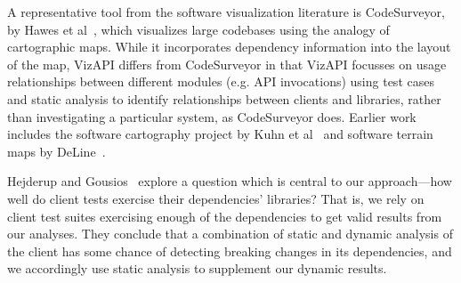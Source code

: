 \label{sec:related-work}
A representative tool from the software visualization literature is
CodeSurveyor, by Hawes et al~\cite{hawes15:_codes}, which visualizes large
codebases using the analogy of cartographic maps. While it
incorporates dependency information into the layout of the map, VizAPI
differs from CodeSurveyor in that VizAPI focusses on usage relationships
between different modules (e.g. API invocations) using test
cases and static analysis to identify relationships between clients and libraries, rather
than investigating a particular system, as CodeSurveyor does.  Earlier
work includes the software cartography project by Kuhn et
al~\cite{kuhn10:_softw} and software terrain maps by DeLine~\cite{deline05:_stayin}.




Hejderup and Gousios~\cite{DBLP:journals/jss/HejderupG22} explore a
question which is central to our approach---how well do client tests
exercise their dependencies' libraries? That is, we rely on
client test suites exercising enough of the dependencies to get valid
results from our analyses. They conclude that a combination of
static and dynamic analysis of the client has some chance of detecting
breaking changes in its dependencies, and we accordingly use static
analysis to supplement our dynamic results.


